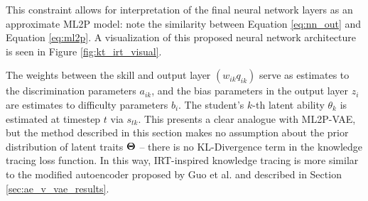 This constraint allows for interpretation of the final neural network layers as an approximate ML2P model: note the similarity between Equation \ref{eq:nn_out} and Equation \ref{eq:ml2p}. A visualization of this proposed neural network architecture is seen in Figure \ref{fig:kt_irt_visual}.

The weights between the skill and output layer $(w_{ik}q_{ik})$ serve as estimates to the discrimination parameters $a_{ik}$, and the bias parameters in the output layer $z_i$ are estimates to difficulty parameters $b_i$. The student's $k$-th latent ability $\theta_k$ is estimated at timestep $t$ via $s_{tk}$. This presents a clear analogue with ML2P-VAE, but the method described in this section makes no assumption about the prior distribution of latent traits $\boldsymbol{\Theta}$ -- there is no KL-Divergence term in the knowledge tracing loss function. In this way, IRT-inspired knowledge tracing is more similar to the modified autoencoder proposed by Guo et al. \cite{guo2017} and described in Section \ref{sec:ae_v_vae_results}.

